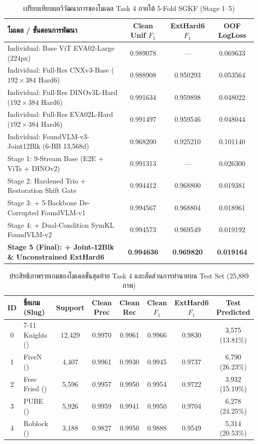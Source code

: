 \documentclass[11pt,a4paper]{article}
\DeclareRobustCommand{\code}[1]{\leavevmode{\ttfamily\color{KeyGreen!85!black}\let\codeunderscore\_\def\_{\codeunderscore\allowbreak}\hyphenpenalty=50\exhyphenpenalty=50\relax#1}}
\newcommand{\tblfont}{\fontsize{10}{15.0}\selectfont\arrayrulecolor{RuleGray}}
\begin{document}
\begin{table}[H]\centering
{\tblfont
\caption{เปรียบเทียบผลวิวัฒนาการของโมเดล Task 4 ภายใต้ 5-Fold SGKF (Stage 1--5)}
\label{tab:t4_ablation}
\begin{tabular}{L{7.6cm}ccc}
\toprule
{} \textbf{โมเดล / ขั้นตอนการพัฒนา} & \textbf{Clean Unif $F_1$} & \textbf{ExtHard6 $F_1$} & \textbf{OOF LogLoss} \\
\midrule
Individual: Base ViT EVA02-Large (224px) & 0.989078 & --- & 0.069633 \\
Individual: Full-Res CNXv3-Base ($192 \times 384$ Hard6) & 0.988908 & 0.950293 & 0.053564 \\
Individual: Full-Res DINOv3L-Hard ($192 \times 384$ Hard6) & 0.991634 & 0.959898 & 0.048022 \\
Individual: Full-Res EVA02L-Hard ($192 \times 384$ Hard6) & 0.991497 & 0.959546 & 0.048044 \\
Individual: FoundVLM-v3-Joint12Blk (6-BB 13,568d) & 0.968200 & 0.925210 & 0.101140 \\
Stage 1: 9-Stream Base (E2E + ViTs + DINOv2) & 0.991313 & --- & 0.026300 \\
Stage 2: Hardened Trio + Restoration Shift Gate & 0.994412 & 0.968800 & 0.019381 \\
Stage 3: + 5-Backbone De-Corrupted FoundVLM-v1 & 0.994567 & 0.968804 & 0.018961 \\
Stage 4: + Dual-Condition SymKL FoundVLM-v2 & 0.994573 & 0.969549 & 0.019192 \\
 \textbf{Stage 5 (Final): + Joint-12Blk \& Unconstrained ExtHard6} & \textbf{0.994636} & \textbf{0.969820} & \textbf{0.019164} \\
\bottomrule
\end{tabular}}
\end{table}

\begin{table}[H]\centering
{\tblfont\setlength{\tabcolsep}{3.6pt}
\caption{ประสิทธิภาพรายเกมของโมเดลขั้นสุดท้าย Task 4 และสัดส่วนการทำนายบน Test Set (25,889 ภาพ)}
\label{tab:t4_perclass}
\begin{tabular}{clcccccc}
\toprule
\rowcolor{TableHead} \textbf{ID} & \textbf{ชื่อเกม (Slug)} & \textbf{Support} & \textbf{Clean Prec} & \textbf{Clean Rec} & \textbf{Clean $F_1$} & \textbf{ExtHard6 $F_1$} & \textbf{Test Predicted} \\
\midrule
0 & 7-11 Knights (\code{7-11k}) & 12,429 & 0.9970 & 0.9961 & 0.9966 & 0.9830 & 3,575 (13.81\%) \\
1 & FiveN (\code{fiveN}) & 4,407 & 0.9961 & 0.9930 & 0.9945 & 0.9737 & 6,790 (26.23\%) \\
2 & Free Fried (\code{freefried}) & 5,596 & 0.9957 & 0.9950 & 0.9954 & 0.9722 & 3,932 (15.19\%) \\
3 & PUBE (\code{pube}) & 5,926 & 0.9959 & 0.9941 & 0.9950 & 0.9704 & 6,278 (24.25\%) \\
4 & Roblock (\code{roblock}) & 3,188 & 0.9827 & 0.9950 & 0.9888 & 0.9549 & 5,314 (20.53\%) \\
\bottomrule
\end{tabular}}
\end{table}
\end{document}
